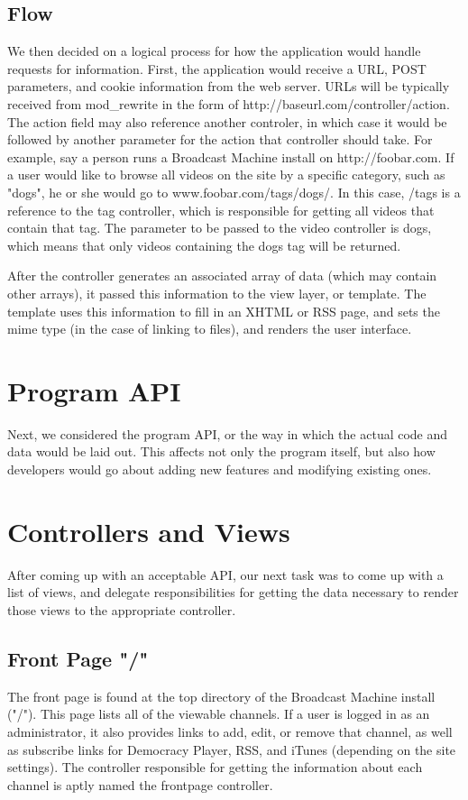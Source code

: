 \documentclass[a4paper,12pt]{report}
\begin{document}
\begin{description}
\subsection{Flow}
We then decided on a logical process for how the application would handle requests for information. First, the application would receive a URL, POST parameters, and cookie information from the web server. URLs will be typically received from mod_rewrite in the form of http://baseurl.com/controller/action. The action field may also reference another controler, in which case it would be followed by another parameter for the action that controller should take. For example, say a person runs a Broadcast Machine install on http://foobar.com. If a user would like to browse all videos on the site by a specific category, such as "dogs", he or she would go to www.foobar.com/tags/dogs/. In this case, /tags is a reference to the tag controller, which is responsible for getting all videos that contain that tag. The parameter to be passed to the video controller is dogs, which means that only videos containing the dogs tag will be returned. 

After the controller generates an associated array of data (which may contain other arrays), it passed this information to the view layer, or template. The template uses this information to fill in an XHTML or RSS page, and sets the mime type (in the case of linking to files), and renders the user interface.

\section{Program API}
Next, we considered the program API, or the way in which the actual code and data would be laid out. This affects not only the program itself, but also how developers would go about adding new features and modifying existing ones.

\section{Controllers and Views}
After coming up with an acceptable API, our next task was to come up with a list of views, and delegate responsibilities for getting the data necessary to render those views to the appropriate controller.

\subsection{Front Page "/"}
The front page is found at the top directory of the Broadcast Machine install ("/"). This page lists all of the viewable channels. If a user is logged in as an administrator, it also provides links to add, edit, or remove that channel, as well as subscribe links for Democracy Player, RSS, and iTunes (depending on the site settings). The controller responsible for getting the information about each channel is aptly named the frontpage controller.


\end{description}
\end{document}
